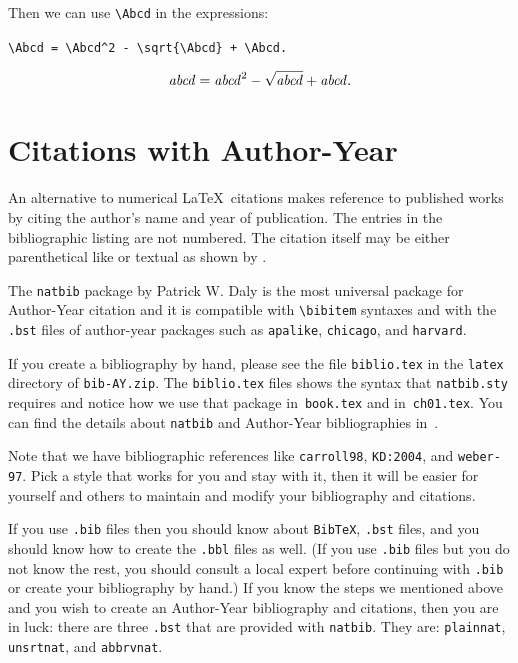 \documentclass{book}\usepackage[]{graphicx}\usepackage[]{color}
\begin{document}
\noindent
Then we can use \verb+\Abcd+ in the expressions:

\verb|\Abcd = \Abcd^2 - \sqrt{\Abcd} + \Abcd.|

$$
\mathit{abcd} = \mathit{abcd}^2 - \sqrt{\mathit{abcd}} + \mathit{abcd}.
$$


\clearpage

    


\chapter{Citations with Author-Year}
\label{ch06}

An alternative to numerical \LaTeX\ citations makes reference to published
works by citing the author's name and year of publication. The entries in 
the bibliographic listing are not numbered. The citation itself may be 
either parenthetical like \citep{carroll98} or textual as shown by
\citet{carroll98}.

The \verb+natbib+ package by Patrick W. Daly is the most universal package
for Author-Year citation and it is compatible with \verb+\bibitem+ syntaxes
and with the \verb+.bst+ files of author-year packages such as
\verb+apalike+, \verb+chicago+, and \verb+harvard+.

If you create a bibliography by hand, please see the file \verb+biblio.tex+
in the \verb+latex+ directory of \verb+bib-AY.zip+.
The \verb+biblio.tex+ files shows the syntax that \verb+natbib.sty+ 
requires and notice how we use
that package in~\verb+book.tex+ and in~\verb+ch01.tex+. 
You can find the details about \verb+natbib+ and Author-Year bibliographies
in~\citet[pages~218-221]{KD:2004}.

Note that we have bibliographic references like \verb+carroll98+,
\verb+KD:2004+, and \verb+weber-97+. Pick a style that works for you
and stay with it, then it will be easier for yourself and others to 
maintain and modify your bibliography and citations.

If you use \verb+.bib+ files then you should know about \verb+BibTeX+,
\verb+.bst+ files, and you should know how to create the \verb+.bbl+
files as well.
(If you use \verb+.bib+ files but you do not know the rest, you should
consult a local expert before continuing with \verb+.bib+ or create
your bibliography by hand.)
If you know the steps we mentioned above and you wish to create an 
Author-Year bibliography and citations, then you are in luck: 
there are three \verb+.bst+ that are provided with \verb+natbib+.
They are: \verb+plainnat+, \verb+unsrtnat+, and \verb+abbrvnat+.
\end{document}
